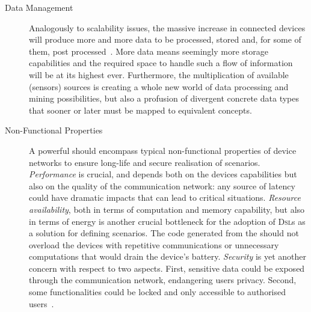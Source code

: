 \begin{description}
	\item[Data Management] Analogously to scalability issues, the massive increase in connected devices will produce more and more data to be processed, stored and, for some of them, post processed~\cite{lee-15}. More data means seemingly more storage capabilities and the required space to handle such a flow of information will be at its highest ever. Furthermore, the multiplication of available (sensors) sources is creating a whole new world of data processing and mining possibilities, but also a profusion of divergent concrete data types that sooner or later must be mapped to equivalent concepts.
	
	\item[Non-Functional Properties] A powerful \DSL should encompass typical non-functional properties of device networks to ensure long-life and secure realisation of scenarios. \emph{Performance} is crucial, and depends both on the devices capabilities but also on the quality of the communication network: any source of latency could have dramatic impacts that can lead to critical situations. \emph{Resource availability}, both in terms of computation and memory capability, but also in terms of energy is another crucial bottleneck for the adoption of \textsc{Dsl}s as a solution for defining scenarios. The code generated from the \DSL should not overload the devices with repetitive communications or unnecessary computations that would drain the device's battery. \emph{Security} is yet another concern with respect to two aspects. First, sensitive data could be exposed through the communication network, endangering users privacy. Second, some functionalities could be locked and only accessible to authorised users~\cite{tan-10}.

\end{description}

